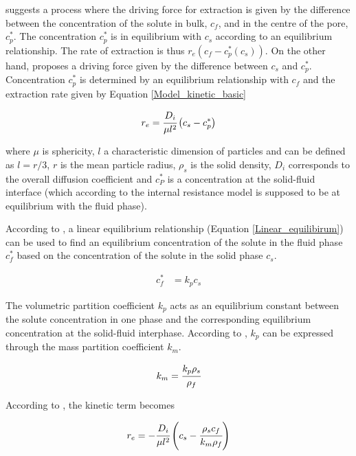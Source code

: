 \documentclass[../Article_Model_Parameters.tex]{subfiles}
\begin{document}
			\citet{Bulley1984} suggests a process where the driving force for extraction is given by the difference between the concentration of the solute in bulk, $c_f$, and in the centre of the pore, $c_p^*$. The concentration $c_p^*$ is in equilibrium with $c_s$ according to an equilibrium relationship. The rate of extraction is thus $r_e\left(c_f - c^*_p(c_s)\right)$. On the other hand, \citet{Reverchon1996} proposes a driving force given by the difference between $c_s$ and $c_p^*$. Concentration $c_p^*$ is determined by an equilibrium relationship with $c_f$ and the extraction rate given by Equation \ref{Model_kinetic_basic}
			
			{\footnotesize
				\begin{equation} \label{Model_kinetic_basic}
					r_e = \cfrac{D_i}{\mu l^2 }\left(c_s - c_p^* \right)
			\end{equation} }
			
			where $\mu$ is sphericity, $l$ a characteristic dimension of particles and can be defined as $l = r/3$, $r$ is the mean particle radius, $\rho_s$ is the solid density, $D_i$ corresponds to the overall diffusion coefficient and $c_P^*$ is a concentration at the solid-fluid interface (which according to the internal resistance model is supposed to be at equilibrium with the fluid phase). 
			
			According to \citet{Bulley1984}, a linear equilibrium relationship (Equation \ref{Linear_equilibirum}) can be used to find an equilibrium concentration of the solute in the fluid phase $c_f^*$ based on the concentration of the solute in the solid phase $c_s$.
			
			{\footnotesize
				\begin{align} \label{Linear_equilibirum}
					c_f^* &= k_p c_s
			\end{align} }
			
			The volumetric partition coefficient $k_p$ acts as an equilibrium constant between the solute concentration in one phase and the corresponding equilibrium concentration at the solid-fluid interphase. According to \citet{Spiro2007}, $k_p$ can be expressed through the mass partition coefficient $k_m$.
			
			{\footnotesize
				\begin{align}
					k_m = \cfrac{k_p \rho_s}{\rho_f}
			\end{align} }
			
			According to \citet{Reverchon1996}, the kinetic term becomes
			
			{\footnotesize
				\begin{equation}
					\label{Model_kinetic_no_sat}
					r_e = -\cfrac{D_i}{ \mu l^2 } \left(c_s - \cfrac{\rho_s c_f}{k_m \rho_f} \right)
			\end{equation} }
			
\end{document}
